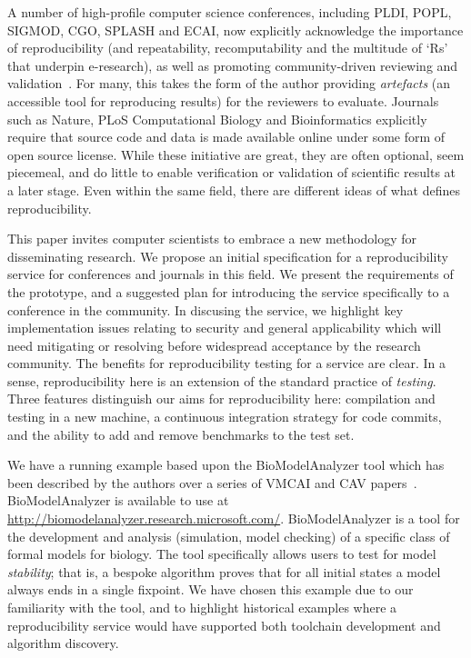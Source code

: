\documentclass[conference]{IEEEtran}
\begin{document}
A number of high-profile computer science conferences, including PLDI,
POPL, SIGMOD, CGO, SPLASH and ECAI, now explicitly acknowledge the
importance of reproducibility (and repeatability, recomputability and
the multitude of `Rs' that underpin e-research), as well as promoting
community-driven reviewing and validation~\cite{fursin+dubach:2014}.
For many, this takes the form of the author providing \emph{artefacts}
(an accessible tool for reproducing results) for the reviewers to
evaluate. Journals such as Nature, PLoS Computational Biology and
Bioinformatics explicitly require that source code and data is made
available online under some form of open source license. While these
initiative are great, they are often optional, seem piecemeal, and do
little to enable verification or validation of scientific results at a
later stage. Even within the same field, there are different ideas of
what defines reproducibility.

This paper invites computer scientists to embrace a new methodology
for disseminating research. We propose an initial specification for a
reproducibility service for conferences and journals in this field. We
present the requirements of the prototype, and a suggested plan for
introducing the service specifically to a conference in the
community. In discusing the service, we highlight key implementation
issues relating to security and general applicability which will need
mitigating or resolving before widespread acceptance by the research
community.  The benefits for reproducibility testing for a service are
clear. In a sense, reproducibility here is an extension of the
standard practice of \emph{testing}.  Three features distinguish our
aims for reproducibility here: compilation and testing in a new
machine, a continuous integration strategy for code commits, and the
ability to add and remove benchmarks to the test set.

We have a running example based upon the BioModelAnalyzer tool which
has been described by the authors over a series of VMCAI and CAV
papers~\cite{cook-et-al:2011,benque-et-al:2012,cook-et-al:2014}.
BioModelAnalyzer is available to use at
\url{http://biomodelanalyzer.research.microsoft.com/}.
BioModelAnalyzer is a tool for the development and analysis
(simulation, model checking) of a specific class of formal models for
biology. The tool specifically allows users to test for model
\emph{stability}; that is, a bespoke algorithm proves that for all
initial states a model always ends in a single fixpoint. We have
chosen this example due to our familiarity with the tool, and to
highlight historical examples where a reproducibility service would
have supported both toolchain development and algorithm discovery.
\end{document}
